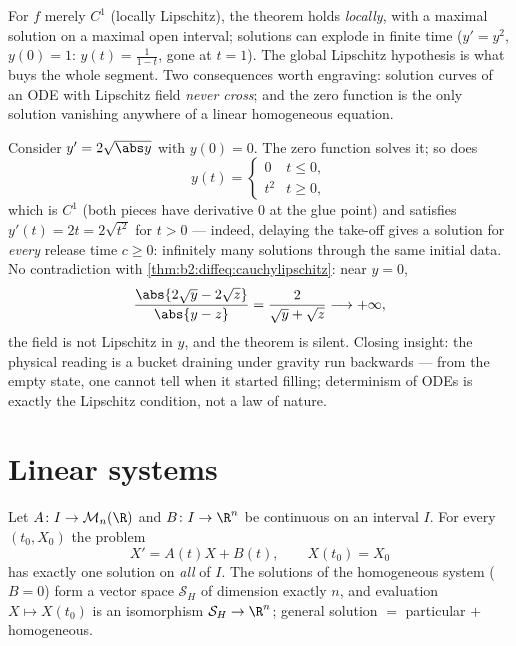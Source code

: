 \begin{remark}
For $f$ merely $C^1$ (locally Lipschitz), the theorem holds
\emph{locally}, with a maximal solution on a maximal open interval;
solutions can explode in finite time ($y' = y^2$, $y(0) = 1$: $y(t)
= \frac{1}{1-t}$, gone at $t = 1$). The global Lipschitz hypothesis
is what buys the whole segment. Two consequences worth engraving:
solution curves of an ODE with Lipschitz field \emph{never cross};
and the zero function is the only solution vanishing anywhere of a
linear homogeneous equation.
\end{remark}

\begin{example}\label{ex:b2:diffeq:leaky}
Consider $y' = 2\sqrt{\abs y}$ with $y(0) = 0$. The zero
function solves it; so does
\[
y(t) = \begin{cases} 0 & t \leq 0,\\ t^2 & t \geq 0,
\end{cases}
\]
which is $C^1$ (both pieces have derivative $0$ at the glue
point) and satisfies $y'(t) = 2t = 2\sqrt{t^2}$ for $t > 0$ ---
indeed, delaying the take-off gives a solution for \emph{every}
release time $c \geq 0$: infinitely many solutions through the
same initial data. No contradiction with
\cref{thm:b2:diffeq:cauchylipschitz}: near $y = 0$,
\[
\frac{\abs{2\sqrt y - 2\sqrt z}}{\abs{y - z}}
= \frac{2}{\sqrt y + \sqrt z} \longrightarrow +\infty ,
\]
the field is not Lipschitz in $y$, and the theorem is silent.
Closing insight: the physical reading is a bucket draining
under gravity run backwards --- from the empty state, one
cannot tell when it started filling; determinism of ODEs is
exactly the Lipschitz condition, not a law of nature.
\end{example}

\section{Linear systems}

\begin{theorem}\label{thm:b2:diffeq:linear}
Let $A \colon I \to \mathcal{M}_n(\R)$ and $B \colon I \to \R^n$ be
continuous on an interval $I$. For every $(t_0, X_0)$ the problem
\[
X' = A(t)X + B(t), \qquad X(t_0) = X_0
\]
has exactly one solution on \emph{all} of $I$. The solutions of the
homogeneous system ($B = 0$) form a vector space $\mathcal{S}_H$ of
dimension exactly $n$, and evaluation $X \mapsto X(t_0)$ is an
isomorphism $\mathcal{S}_H \to \R^n$; general solution $=$
particular $+$ homogeneous.
\end{theorem}


